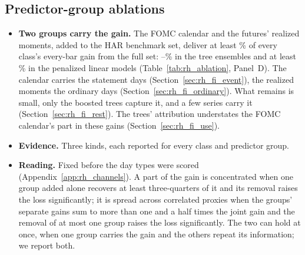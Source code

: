 
\subsection{Predictor-group ablations}
\label{sec:rh_fi}
\label{sec:rh_results_ablation}
\ifdefined\rhfipNOrigins\else\fi
\ifdefined\rhabLgbmFullAllPct\else\fi
\ifdefined\rhcxWMain\else\fi
\ifdefined\rhchNEventDays\else\fi
\ifdefined\rhfaReading\else\fi
\ifdefined\rhbyLXgbReading\else\fi
\ifdefined\rhbyFXgbReading\else\fi
\begin{itemize}
\item \textbf{Two groups carry the gain.} The FOMC calendar and the futures' realized moments, added to the HAR
  benchmark set, deliver at least \rhabBaseShareMin\% of every class's every-bar gain from the full set:
  \rhabBaseShareTreeMin--\rhabBaseShareTreeMax\% in the tree ensembles and at least \rhabBaseShareLinMin\% in the
  penalized linear models (Table~\ref{tab:rh_ablation}, Panel~D). The calendar carries the statement days
  (Section~\ref{sec:rh_fi_event}), the realized moments the ordinary days (Section~\ref{sec:rh_fi_ordinary}). What
  remains is small, only the boosted trees capture it, and a few series carry it (Section~\ref{sec:rh_fi_rest}). The
  trees' attribution understates the FOMC calendar's part in these gains (Section~\ref{sec:rh_fi_use}).
\item \textbf{Evidence.} Three kinds, each reported for every class and predictor group.
\item \textbf{Reading.} Fixed before the day types were scored (Appendix~\ref{app:rh_channels}). A part of the gain is
  concentrated when one group added alone recovers at least three-quarters of it and its removal raises the loss
  significantly; it is spread across correlated proxies when the groups' separate gains sum to more than one and a
  half times the joint gain and the removal of at most one group raises the loss significantly. The two can hold at
  once, when one group carries the gain and the others repeat its information; we report both.
\end{itemize}

